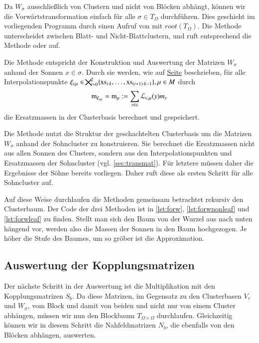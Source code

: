     Da $W_\sigma$ ausschließlich von Clustern und nicht von Blöcken abhängt, können wir die Vorwärtstransformation einfach für alle $\sigma \in T_\Omega$ durchführen. Dies geschieht
    im vorliegenden Programm durch einen Aufruf von  mit $root(T_\Omega)$. Die Methode  unterscheidet zwischen Blatt- und Nicht-Blattclustern, und ruft 
    entsprechend die Methode  oder  auf. 
    
    Die Methode  entspricht der Konstruktion und Auswertung der Matrizen $W_\sigma$ anhand der Sonnen $x \in \sigma$. Durch sie werden, wie auf 
    \hyperref[w:ersatzmassen]{Seite}\pageref{w:ersatzmassen} beschrieben, für alle Interpolationspunkte 
    $\xi_{\tcode{c}\mu} \in \bigtimes_{i=0}^2 \{\tcode{xs}_{i \cdot k}, \dots ,\tcode{xs}_{(i+1) \cdot k-1}\}, \mu \in M$ durch
    \[
      \tcode{m}_{\xi_{\tcode{c}\mu}} = \tcode{m}_\mu := \sum_{y \in \tcode{c}} \lag_{\tcode{c},\mu}(y) m_y
    \]
    die Ersatzmassen in der Clusterbasis berechnet und gespeichert.
    
    Die Methode  nutzt die Struktur der geschachtelten Clusterbasis um die Matrizen $W_\sigma$ anhand der Sohncluster zu konstruieren. Sie berechnet die Ersatzmassen
    nicht aus allen Sonnen des Clusters, sondern aus den Interpolationspunkten und Ersatzmassen der Sohncluster (vgl. \autoref{sec:transmat}).
    Für letztere müssen daher die Ergebnisse der Söhne bereits vorliegen. Daher ruft diese als ersten Schritt  für alle Sohncluster  auf. 
    
    Auf diese Weise durchlaufen die Methoden gemeinsam betrachtet rekursiv den Clusterbaum. Der Code der drei Methoden ist in \autoref{lst:forw}, \autoref{lst:forwnonleaf} und \autoref{lst:forwleaf}
    zu finden. Stellt man sich den Baum von der Wurzel aus nach unten hängend vor, werden also die Massen der Sonnen in den Baum hochgezogen. Je höher die Stufe des Baumes, um so gröber ist die 
    Approximation.
    
    
    \subsection{Auswertung der Kopplungsmatrizen}
    \label{sec:kopplung}
    Der nächste Schritt in der Auswertung ist die Multiplikation mit den Kopplungsmatrizen $S_b$. Da diese Matrizen, im Gegensatz zu den Clusterbasen $V_\tau$ und $W_\sigma$, vom Block und damit
    von beiden und nicht nur von einem Cluster abhängen, müssen wir nun den Blockbaum $T_{\Omega \times \Omega}$ durchlaufen. 
    Gleichzeitig können wir in diesem Schritt die Nahfeldmatrizen $N_b$, die ebenfalls von den Blöcken abhängen, auswerten. 
    

